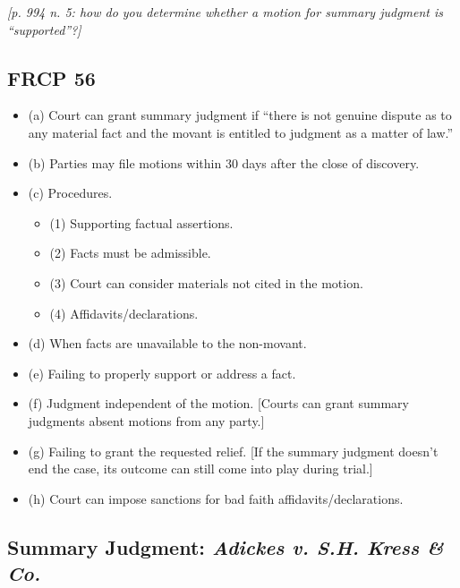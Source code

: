 \emph{[p. 994 n. 5: how do you determine whether a motion for summary judgment 
is ``supported''?]}

\subsection{FRCP 56}

\begin{itemize}
    \item (a) Court can grant summary judgment if ``there is not genuine 
    dispute as to any material fact and the movant is entitled to judgment as 
    a matter of law.''
    \item (b) Parties may file motions within 30 days after the close of 
    discovery.
    \item (c) Procedures.
    \begin{itemize}
        \item (1) Supporting factual assertions.
        \item (2) Facts must be admissible.
        \item (3) Court can consider materials not cited in the motion.
        \item (4) Affidavits/declarations.
    \end{itemize}
    \item (d) When facts are unavailable to the non-movant.
    \item (e) Failing to properly support or address a fact.
    \item (f) Judgment independent of the motion. [Courts can grant summary 
    judgments absent motions from any party.]
    \item (g) Failing to grant the requested relief. [If the summary judgment 
    doesn't end the case, its outcome can still come into play during trial.]
    \item (h) Court can impose sanctions for bad faith 
    affidavits/declarations.
\end{itemize}

\subsection{Summary Judgment: \emph{Adickes v. S.H. Kress \& Co.}}

